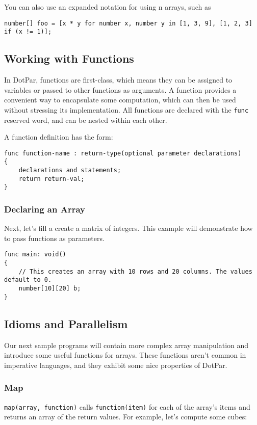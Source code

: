 You can also use an expanded notation for using n arrays, such as

\begin{verbatim}
number[] foo = [x * y for number x, number y in [1, 3, 9], [1, 2, 3] if (x != 1)];
\end{verbatim}

\subsection{Working with Functions}
In DotPar, functions are first-class, which means they can be assigned to
variables or passed to other functions as arguments. A function provides a
convenient way to encapsulate some computation, which can then be used without
stressing its implementation. All functions are declared with the \verb=func=
reserved word, and can be nested within each other.

A function definition has the form:

\begin{verbatim}
func function-name : return-type(optional parameter declarations)
{
    declarations and statements;
    return return-val;
}
\end{verbatim}

\subsubsection{Declaring an Array}
Next, let's fill a create a matrix of integers. This example will demonstrate
how to pass functions as parameters.

\begin{verbatim}
func main: void()
{
    // This creates an array with 10 rows and 20 columns. The values default to 0.
    number[10][20] b;
}
\end{verbatim}

\subsection{Idioms and Parallelism}
Our next sample programs will contain more complex array manipulation and
introduce some useful functions for arrays. These functions aren't common in
imperative languages, and they exhibit some nice properties of DotPar.

\subsubsection{Map}
\verb=map(array, function)= calls \verb=function(item)= for each of the array's
items and returns an array of the return values.  For example, let's compute
some cubes:

